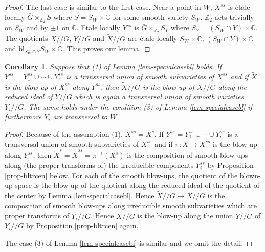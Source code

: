 \documentclass[10pt]{amsart}
\newtheorem{corollary}[theorem]{Corollary}
\theoremstyle{definition}
\newcommand{\CC}{\mathbb{C}}
\newcommand{\ZZ}{\mathbb{Z}}
\def\git{/\!/ }
\begin{document}
\begin{proof}
The last case is similar to the first case. Near a point in $W$,
$X^{ss}$ is \'etale locally $\bar G\times_{\ZZ_2}S$ where
$S=S_W\times\CC$ for some smooth variety $S_W$. $\ZZ_2$ acts
trivially on $S_W$ and by $\pm 1$ on $\CC$. Etale locally $Y^{ss}$
is $\bar G\times_{\ZZ_2}S_Y$ where $S_Y=(S_W\cap Y)\times \CC$.
The quotients $X\git G$, $Y\git G$ and $\widetilde{X}\git G$ are
\'etale locally $S_W\times \CC$, $(S_W\cap Y)\times \CC$ and
$\mathrm{bl}_{S_W\cap Y}S_W\times \CC$. This proves our lemma.
\end{proof}
\begin{corollary}\label{cor-blcomquot}
Suppose that (1) of Lemma \ref{lem-specialcasebl} holds. If
$Y^{ss}=Y_1^{ss}\cup\cdots\cup Y_r^{ss}$ is a transversal union of
smooth subvarieties of $X^{ss}$ and if $\widetilde{X}$ is the
blow-up of $X^{ss}$ along $Y^{ss}$, then $\widetilde{X}\git G$ is
the blow-up of $X\git G$ along the reduced ideal of $Y\git G$
which is again a transversal union of smooth varieties $Y_i\git
G$. The same holds under the condition (3) of Lemma
\ref{lem-specialcasebl} if furthermore $Y_i$ are transversal to
$W$.
\end{corollary}
\begin{proof}
Because of the assumption (1), $X^{ss}=X^s.$ If
$Y^{ss}=Y_1^{ss}\cup\cdots\cup Y_r^{ss}$ is a transversal union of
smooth subvarieties of $X^{ss}$ and if $\pi:\widetilde{X}\to
X^{ss}$ is the blow-up along $Y^{ss}$, then
$\widetilde{X}^s=\widetilde{X}^{ss}=\pi^{-1}(X^s)$ is the
composition of smooth blow-ups along (the proper transforms of)
the irreducible components $Y_i^{ss}$ by Proposition
\ref{prop-bltrcen} below. For each of the smooth blow-ups, the
quotient of the blown-up space is the blow-up of the quotient
along the reduced ideal of the quotient of the center by Lemma
\ref{lem-specialcasebl}. Hence $\widetilde{X}\git G\to X\git G$ is
the composition of smooth blow-ups along irreducible smooth
subvarieties which are proper transforms of $Y_i\git G$. Hence
$\widetilde{X}\git G$ is the blow-up along the union $Y\git G$ of
$Y_i\git G$ by Proposition \ref{prop-bltrcen} again.

The case (3) of Lemma \ref{lem-specialcasebl} is similar and we
omit the detail.
\end{proof}
\end{document}
